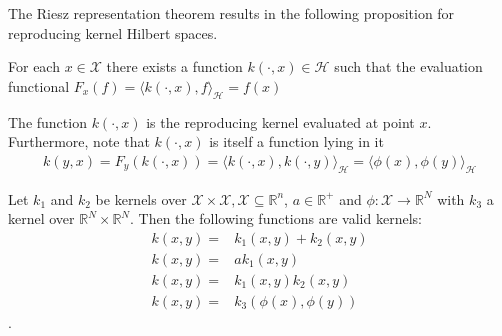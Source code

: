 


The Riesz representation theorem results in the following proposition for reproducing kernel Hilbert spaces.
\begin{proposition}
For each $x \in \mathcal{X}$ there exists a function $k(\cdot, x) \in \mathcal{H}$ such that the evaluation functional $F_{x}(f)=\langle k(\cdot, x), f\rangle_{\mathcal{H}}=f(x)$    
\end{proposition}

The function $k(\cdot, x)$ is the reproducing kernel evaluated at point $x$.
Furthermore, note that $k(\cdot, x)$ is itself a function lying in it
\begin{align*}
    k(y, x)=F_{y}(k(\cdot, x))=\langle k(\cdot, x), k(\cdot, y)\rangle_{\mathcal{H}}=\langle \phi(x), \phi(y)\rangle_{\mathcal{H}}
\end{align*}



\begin{proposition}
    Let $k_1$ and $k_2$ be kernels over $\mathcal{X} \times \mathcal{X}, \mathcal{X} \subseteq \mathbb{R}^n$, $a \in \mathbb{R}^+$ and $\phi: \mathcal{X} \to \mathbb{R}^N$ with $k_3$ a kernel over $\mathbb{R}^N \times \mathbb{R}^N$. Then the following functions are valid kernels:
    $$
    \begin{aligned}
        k(x,y)=&k_1(x,y)+k_2(x,y)
        \\
        k(x,y)=& ak_1(x,y)
        \\
        k(x,y)=& k_1(x,y)k_2(x,y)
        \\
        k(x,y)=& k_3(\phi(x),\phi(y))
    \end{aligned}
    $$.
\end{proposition}


